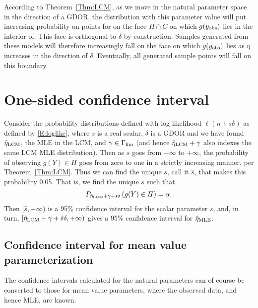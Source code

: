 According to Theorem~\ref{Thm:LCM}, as we move in the natural parameter space in the 
direction of a GDOR, the distribution with this parameter value will 
put increasing probability on points for  
on the face $H \cap C$ on which $g(y_{\textrm{obs}})$ lies in the interior of.  
This face is orthogonal to $\delta
$ by construction.  Samples generated 
from these models will therefore increasingly fall on the face on which $g(y_{\textrm{obs}})$ 
lies as $\eta$ increases in the direction of $\delta$.  Eventually, all generated sample points will fall on this boundary.


\section{One-sided confidence interval}

Consider the probability distributions defined with log likelihood $\ell( \eta + s 
\delta)$ as defined 
by \eqref{E:loglike}, where $s$ is a real scalar, $\delta$ is a GDOR and 
we have found $\hat{\eta}_{\textrm{LCM}}$, the MLE in the LCM, and $\gamma \in \Gamma_{\textrm{lim}}$
(and hence $\hat{\eta}_{\textrm{LCM}} + \gamma$ also indexes the same LCM MLE distribution).  Then 
as $s$ goes from $-\infty$ to $+\infty$, the probability of observing $g(Y) \in H$ 
goes from zero to one in a strictly increasing manner, per Theorem~\ref{Thm:LCM}.  Thus we can find the unique $s$, call it $\hat{s}$, that makes 
this probability 0.05.  That is, we find the unique $s$ such that
\begin{align*}
	P_{\hat{\eta}_{\textrm{LCM}} + \gamma + s\delta}\left (g(Y) \in H \right ) = \alpha.
\end{align*}
Then $[\hat{s}, +\infty)$ is a 95\% confidence interval for 
the scalar parameter 
$s$, and, in turn, $[\hat{\eta}_{\textrm{LCM}} + \gamma + \hat{s}\delta, +\infty)$ gives 
a 95\% confidence interval for $\hat{\eta}_{\textrm{MLE}}$.

\subsection{Confidence interval for mean value parameterization}
The confidence intervals calculated for the natural parameters can of 
course be converted to those for mean value parameters, where the observed
data, and hence MLE, are known.  

